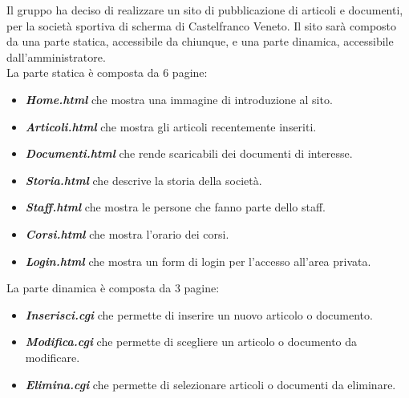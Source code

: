 Il gruppo ha deciso di realizzare un sito di pubblicazione di articoli e documenti, per la societ\`a sportiva di scherma di Castelfranco Veneto. Il sito sar\`a composto da una parte statica, accessibile da chiunque, e una parte dinamica, accessibile dall'amministratore. \\
La parte statica \`e composta da 6 pagine:
\begin{itemize}
	\item {\bfseries\textit{Home.html}} che mostra una immagine di introduzione al sito.
	\item {\bfseries\textit{Articoli.html}} che mostra gli articoli recentemente inseriti.
	\item {\bfseries\textit{Documenti.html}} che rende scaricabili dei documenti di interesse.
	\item {\bfseries\textit{Storia.html}} che descrive la storia della societ\`a.
	\item {\bfseries\textit{Staff.html}} che mostra le persone che fanno parte dello staff.
	\item {\bfseries\textit{Corsi.html}} che mostra l'orario dei corsi.
	\item {\bfseries\textit{Login.html}} che mostra un form di login per l'accesso all'area privata.
\end{itemize}
La parte dinamica \`e composta da 3 pagine:
\begin{itemize}
	\item {\bfseries\textit{Inserisci.cgi}} che permette di inserire un nuovo articolo o documento.
	\item {\bfseries\textit{Modifica.cgi}} che permette di scegliere un articolo o documento da modificare.
	\item {\bfseries\textit{Elimina.cgi}} che permette di selezionare articoli o documenti da eliminare.
\end{itemize}